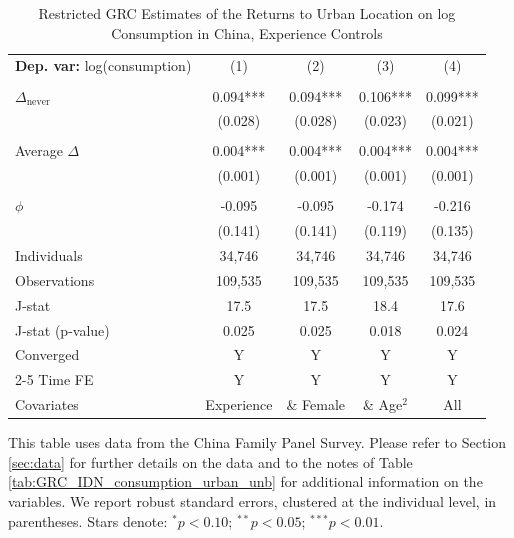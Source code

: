 \begin{table}[htbp] \centering \begin{threeparttable}
 \caption{Restricted GRC Estimates of the Returns to Urban Location on log Consumption in China, Experience Controls} 
 \label{tab:GRC_CHN_consumption_urban_unb_exp} 
\begin{tabular}{l cccc} \toprule  \textbf{Dep. var:}  log(consumption) 
                    &\multicolumn{1}{c}{(1)}   &\multicolumn{1}{c}{(2)}   &\multicolumn{1}{c}{(3)}   &\multicolumn{1}{c}{(4)}   \\
                    &               &               &               &               \\
\addlinespace
$\Delta_{\text{never}}$&       0.094***&       0.094***&       0.106***&       0.099***\\
                    &     (0.028)   &     (0.028)   &     (0.023)   &     (0.021)   \\
                    &               &               &               &               \\
\addlinespace
Average $\Delta$    &       0.004***&       0.004***&       0.004***&       0.004***\\
                    &     (0.001)   &     (0.001)   &     (0.001)   &     (0.001)   \\
                    &               &               &               &               \\
\addlinespace
$\phi$              &      -0.095   &      -0.095   &      -0.174   &      -0.216   \\
                    &     (0.141)   &     (0.141)   &     (0.119)   &     (0.135)   \\
\addlinespace
Individuals         &      34,746   &      34,746   &      34,746   &      34,746   \\
Observations        &     109,535   &     109,535   &     109,535   &     109,535   \\
J-stat              &        17.5   &        17.5   &        18.4   &        17.6   \\
J-stat (p-value)    &       0.025   &       0.025   &       0.018   &       0.024   \\
Converged           &           Y   &           Y   &           Y   &           Y   \\
\cmidrule{2-5} Time FE & Y & Y & Y & Y \\ Covariates & Experience & \& Female & \& Age$^2$ & All \\ \bottomrule \end{tabular} \begin{tablenotes}[flushleft] \footnotesize \item{This table uses data from the China Family Panel Survey. Please refer to Section \ref{sec:data} for further details on the data and to the notes of Table \ref{tab:GRC_IDN_consumption_urban_unb} for additional information on the variables. We report robust standard errors, clustered at the individual level, in parentheses. Stars denote: $^{*} p<0.10$; $^{**} p<0.05$; $^{***} p<0.01$.} \end{tablenotes} \end{threeparttable} \end{table}
